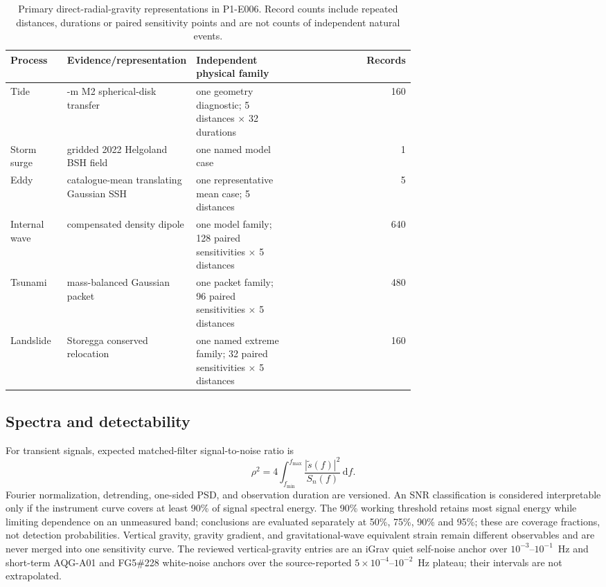 \documentclass[11pt]{article}
\begin{document}
\begin{table}[ht]
\centering
\caption{Primary direct-radial-gravity representations in P1-E006. Record counts include repeated distances, durations or paired sensitivity points and are not counts of independent natural events.}
\label{tab:processes}
\begin{tabular}{>{\raggedright\arraybackslash}p{0.14\linewidth}>{\raggedright\arraybackslash}p{0.31\linewidth}>{\raggedright\arraybackslash}p{0.23\linewidth}r}
\toprule
Process & Evidence/representation & Independent physical family & Records \\
\midrule
Tide & 1-m M2 spherical-disk transfer & one geometry diagnostic; 5 distances $\times$ 32 durations & 160 \\
Storm surge & gridded 2022 Helgoland BSH field & one named model case & 1 \\
Eddy & catalogue-mean translating Gaussian SSH & one representative mean case; 5 distances & 5 \\
Internal wave & compensated density dipole & one model family; 128 paired sensitivities $\times$ 5 distances & 640 \\
Tsunami & mass-balanced Gaussian packet & one packet family; 96 paired sensitivities $\times$ 5 distances & 480 \\
Landslide & Storegga conserved relocation & one named extreme family; 32 paired sensitivities $\times$ 5 distances & 160 \\
\bottomrule
\end{tabular}
\end{table}

\subsection{Spectra and detectability}
For transient signals, expected matched-filter signal-to-noise ratio is
\begin{equation}
 \rho^2=4\int_{f_{\min}}^{f_{\max}}
 \frac{|\tilde{s}(f)|^2}{S_n(f)}\,\mathrm{d}f.
\end{equation}
Fourier normalization, detrending, one-sided PSD, and observation duration are
versioned. An SNR classification is considered interpretable only if the
instrument curve covers at least 90\% of signal spectral energy. The 90\%
working threshold retains most signal energy while limiting dependence on an
unmeasured band; conclusions are evaluated separately at
50\%, 75\%, 90\% and 95\%; these are coverage fractions, not detection
probabilities. Vertical gravity, gravity gradient, and gravitational-wave
equivalent strain remain different observables and are never merged into one
sensitivity curve. The reviewed vertical-gravity entries are an
iGrav quiet self-noise anchor over $10^{-3}$--$10^{-1}$~Hz and short-term
AQG-A01 and FG5\#228 white-noise anchors over the source-reported
$5\times10^{-4}$--$10^{-2}$~Hz plateau; their intervals are not extrapolated.
\end{document}
